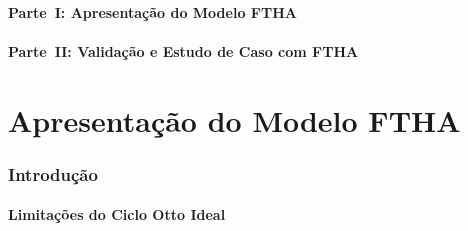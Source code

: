 \subsection{Parte~I: Apresentação do Modelo FTHA}


\subsection{Parte~II: Validação e Estudo de Caso com FTHA}


\part{Apresentação do Modelo FTHA}

\section{Introdução}

\subsection{Limitações do Ciclo Otto Ideal}

